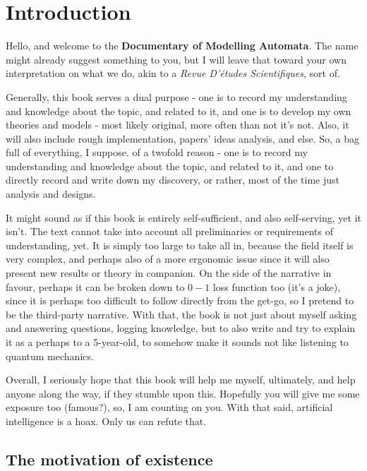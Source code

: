 \chapter{Introduction}

Hello, and welcome to the \textbf{Documentary of Modelling Automata}. The name might already suggest something to you, but I will leave that toward your own interpretation on what we do, akin to a \textit{Revue D'études Scientifiques}, sort of. 

Generally, this book serves a dual purpose - one is to record my understanding and knowledge about the topic, and related to it, and one is to develop my own theories and models - most likely original, more often than not it's not. Also, it will also include rough implementation, papers' ideas analysis, and else. So, a bag full of everything, I suppose.  of a twofold reason - one is to record my understanding and knowledge about the topic, and related to it, and one to directly record and write down my discovery, or rather, most of the time just analysis and designs. 

It might sound as if this book is entirely self-sufficient, and also self-serving, yet it isn't. The text cannot take into account all preliminaries or requirements of understanding, yet. It is simply too large to take all in, because the field itself is very complex, and perhaps also of a more ergonomic issue since it will also present new results or theory in companion. On the side of the narrative in favour, perhaps it can be broken down to $0-1$ loss function too (it's a joke), since it is perhaps too difficult to follow directly from the get-go, so I pretend to be the third-party narrative. With that, the book is not just about myself asking and answering questions, logging knowledge, but to also write and try to explain it as a perhaps to a 5-year-old, to somehow make it sounds not like listening to quantum mechanics. 

Overall, I seriously hope that this book will help me myself, ultimately, and help anyone along the way, if they stumble upon this. Hopefully you will give me some exposure too (famous?), so, I am counting on you. With that said, artificial intelligence is a hoax. Only us can refute that. 

\section{The motivation of existence}

